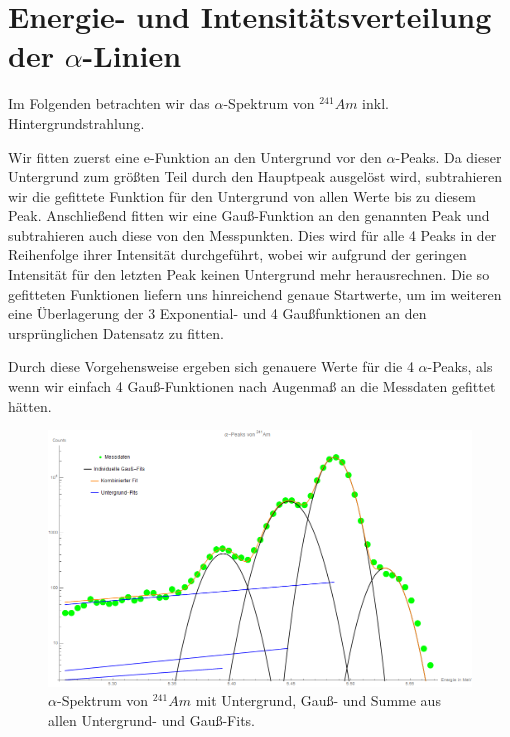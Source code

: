 \documentclass[bigchapter,colorback,accentcolor=tud4b,linedtoc,11pt]{tudreport}
\begin{document}
\section{Energie- und Intensitätsverteilung der $\alpha$-Linien}

Im Folgenden betrachten wir das $\alpha$-Spektrum von $^{241}Am$
inkl. Hintergrundstrahlung. 

Wir fitten zuerst eine e-Funktion an den Untergrund vor den $\alpha$-Peaks. Da
dieser Untergrund zum größten Teil durch den Hauptpeak ausgelöst wird,
subtrahieren wir die gefittete Funktion für den Untergrund von allen Werte bis
zu diesem Peak. Anschließend fitten wir eine Gauß-Funktion an den genannten Peak
und subtrahieren auch diese von den Messpunkten. Dies wird für alle 4 Peaks in
der Reihenfolge ihrer Intensität durchgeführt, wobei wir aufgrund der geringen
Intensität für den letzten Peak keinen Untergrund mehr herausrechnen. Die so
gefitteten Funktionen liefern uns hinreichend genaue Startwerte, um im weiteren
eine Überlagerung der 3 Exponential- und 4 Gaußfunktionen an den ursprünglichen
Datensatz zu fitten.

Durch diese Vorgehensweise ergeben sich genauere Werte für die 4 $\alpha$-Peaks,
als wenn wir einfach 4 Gauß-Funktionen nach Augenmaß an die Messdaten gefittet hätten.

\begin{figure}[H] 
  \centering
     \includegraphics[width=1\textwidth]{img/alpha-spektrum.png}
  \caption{$\alpha$-Spektrum von $^{241}Am$ mit Untergrund, Gauß- und
    Summe aus allen Untergrund- und Gauß-Fits.}
  \label{fig:Bild1}
\end{figure}
\end{document}
